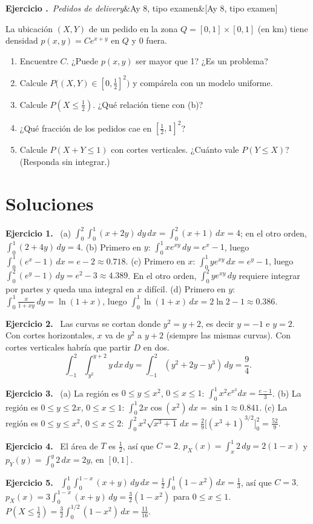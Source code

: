 \documentclass[11pt,a4paper]{article}
\newcounter{ejer}
\newcommand{\ejercicio}[2][]{\refstepcounter{ejer}\par\medskip\noindent\textbf{Ejercicio \theejer.}\ \textit{\small #2}\ifx&#1&\else\hfill{\small\textcolor{gris}{[#1]}}\fi\par}
\newcommand{\sol}[1]{\par\medskip\noindent\textbf{Ejercicio #1.}\ }
\begin{document}
\ejercicio[Ay 8, tipo examen]{Pedidos de delivery}
La ubicación $(X,Y)$ de un pedido en la zona $Q=[0,1]\times[0,1]$ (en km) tiene densidad $p(x,y)=Ce^{x+y}$ en $Q$ y $0$ fuera.
\begin{enumerate}[label=(\alph*),itemsep=0pt]
\item Encuentre $C$. ¿Puede $p(x,y)$ ser mayor que 1? ¿Es un problema?
\item Calcule $P\big((X,Y)\in[0,\tfrac12]^2\big)$ y compárela con un modelo uniforme.
\item Calcule $P(X\le\tfrac12)$. ¿Qué relación tiene con (b)?
\item ¿Qué fracción de los pedidos cae en $[\tfrac12,1]^2$?
\item Calcule $P(X+Y\le1)$ con cortes verticales. ¿Cuánto vale $P(Y\le X)$? (Responda sin integrar.)
\end{enumerate}

\newpage
\section{Soluciones}

\sol{1}
(a) $\int_0^2\int_0^1(x+2y)\,dy\,dx=\int_0^2(x+1)\,dx=4$; en el otro orden, $\int_0^1(2+4y)\,dy=4$.
(b) Primero en $y$: $\int_0^1xe^{xy}\,dy=e^x-1$, luego $\int_0^1(e^x-1)\,dx=e-2\approx0.718$.
(c) Primero en $x$: $\int_0^1ye^{xy}\,dx=e^y-1$, luego $\int_0^2(e^y-1)\,dy=e^2-3\approx4.389$. En el otro orden, $\int_0^2 ye^{xy}\,dy$ requiere integrar por partes y queda una integral en $x$ difícil.
(d) Primero en $y$: $\int_0^1\frac{x}{1+xy}\,dy=\ln(1+x)$, luego $\int_0^1\ln(1+x)\,dx=2\ln2-1\approx0.386$.

\sol{2}
Las curvas se cortan donde $y^2=y+2$, es decir $y=-1$ e $y=2$. Con cortes horizontales, $x$ va de $y^2$ a $y+2$ (siempre las mismas curvas). Con cortes verticales habría que partir $D$ en dos.
\[
\int_{-1}^2\!\!\int_{y^2}^{y+2}y\,dx\,dy=\int_{-1}^2(y^2+2y-y^3)\,dy=\frac94 .
\]

\sol{3}
(a) La región es $0\le y\le x^2$, $0\le x\le1$: $\int_0^1x^2e^{x^3}dx=\frac{e-1}3$.
(b) La región es $0\le y\le2x$, $0\le x\le1$: $\int_0^1 2x\cos(x^2)\,dx=\sin1\approx0.841$.
(c) La región es $0\le y\le x^2$, $0\le x\le2$: $\int_0^2x^2\sqrt{x^3+1}\,dx=\frac29\big[(x^3+1)^{3/2}\big]_0^2=\frac{52}9$.

\sol{4}
El área de $T$ es $\tfrac12$, así que $C=2$. $p_X(x)=\int_x^1 2\,dy=2(1-x)$ y $p_Y(y)=\int_0^y2\,dx=2y$, en $[0,1]$.

\sol{5}
$\int_0^1\int_0^{1-x}(x+y)\,dy\,dx=\frac12\int_0^1(1-x^2)\,dx=\frac13$, así que $C=3$.
$p_X(x)=3\int_0^{1-x}(x+y)\,dy=\frac32(1-x^2)$ para $0\le x\le1$.
$P(X\le\tfrac12)=\frac32\int_0^{1/2}(1-x^2)\,dx=\frac{11}{16}$.
\end{document}
